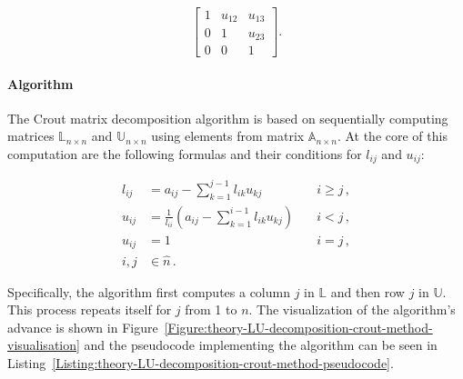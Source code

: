 \begin{equation}
	\begin{bmatrix}
		1      & u_{12} & u_{13} \\
		0      & 1      & u_{23} \\
		0      & 0      & 1
	\end{bmatrix}.
\end{equation}

\paragraph{Algorithm}
The Crout matrix decomposition algorithm is based on sequentially computing matrices $ \mathbb{L}_{n\times n} $ and $ \mathbb{U}_{n\times n} $ using elements from matrix $ \mathbb{A}_{n\times n} $. At the core of this computation are the following formulas and their conditions for $ l_{ij} $ and $ u_{ij} $:

\begin{align}
	l_{ij} &= a_{ij} - \sum_{k=1}^{j-1}l_{ik}u_{kj} 								  &\quad i \geq j\,, \label{Equation:theory-LU-decomposition-crout-method-lij} \\
	u_{ij} &= \frac{1}{l_{ii}} \left ( a_{ij} - \sum_{k=1}^{i-1}l_{ik}u_{kj} \right ) &\quad i < j\,, \\ \label{Equation:theory-LU-decomposition-crout-method-uij}
	u_{ij} &= 1 																	  &\quad i = j\,, \\
	i,j &\in \widehat{n} \nonumber\,.
\end{align}

Specifically, the algorithm first computes a column $ j $ in $ \mathbb{L} $ and then row $ j $ in $ \mathbb{U} $. This process repeats itself for $ j $ from 1 to $ n $. The visualization of the algorithm's advance is shown in Figure~\ref{Figure:theory-LU-decomposition-crout-method-visualisation} and the pseudocode implementing the algorithm can be seen in Listing~\ref{Listing:theory-LU-decomposition-crout-method-pseudocode}.

